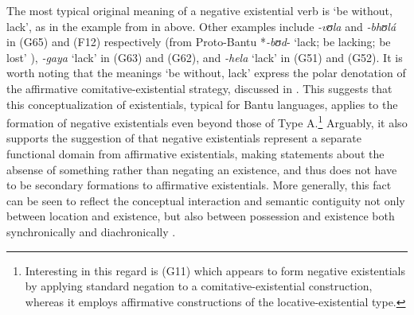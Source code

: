 \documentclass[output=paper]{langscibook}
\begin{document}
The most typical original meaning of a negative existential verb is `be
without, lack', as in the example from  in
 above. Other examples include \textit{-vʊla} and
\textit{-bhʊl{\'a}} in  (G65) and  (F12) respectively
(from Proto-Bantu *\textit{-bʊd}- `lack; be lacking; be lost'
\citep{BastinCoupez2002}), \textit{-gaya} `lack' in  (G63) and
 (G62), and \textit{-hela} `lack' in  (G51) and
 (G52). It is worth noting that the meanings `be without, lack'
express the polar denotation of the affirmative comitative-existential
strategy, discussed in . This suggests that this
conceptualization of existentials, typical for Bantu languages, applies to
the formation of negative existentials even beyond those of Type
A.\footnote{Interesting in this regard is  (G11) which appears to
form negative existentials by applying standard negation to a
comitative-existential construction, whereas it employs affirmative
constructions of the locative-existential type.} 
% 
Arguably, it also supports the suggestion of \citet{Veselinova2013} that
negative existentials represent a separate functional domain from
affirmative existentials, making statements about the absense of something
rather than negating an existence, and thus does not have to be secondary
formations to affirmative existentials. 
%
More generally, this fact can be seen to reflect the conceptual interaction
and semantic contiguity not only between location and existence, but also
between possession and existence both synchronically and diachronically
\parencites(see e.g.)(){Koch1999}{Koch2012}{Heine1997}[see
also][]{Veselinova2013}.
\end{document}
